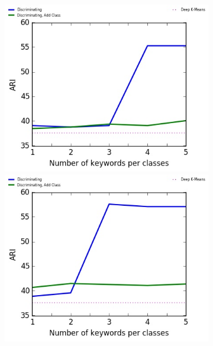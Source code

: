 \begin{figure}[!h]
\begin{subfigure}[b]{\textwidth}
\begin{minipage}{0.5\linewidth}
\centering
  \includegraphics[scale=0.49]{parts/res/dat_file/ari/20NEWS.jpg}     
\end{minipage}
  \begin{minipage}{0.5\linewidth}
\centering
   \includegraphics[scale=0.49]{parts/res/dat_file/ari/20NEWS_simple.jpg}     
\end{minipage}
\end{subfigure}
\begin{subfigure}[b]{\textwidth}
\begin{minipage}{0.5\linewidth}
\centering

\end{minipage}
\end{subfigure}
\end{figure}
